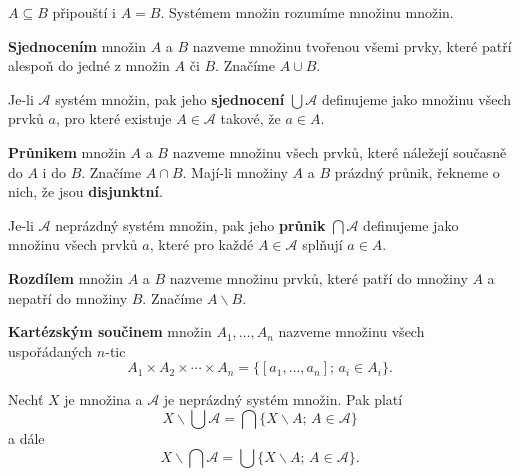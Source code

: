 \begin{poznamka}
	$A\subseteq B$ připouští i $A=B$. Systémem množin rozumíme množinu množin.
\end{poznamka}

\begin{definice}
\textbf{Sjednocením} množin $A$ a $B$ nazveme množinu tvořenou všemi prvky, které patří alespoň do jedné z množin $A$ či $B$. Značíme $A \cup B$.
\par Je-li $\mathcal{A}$ systém množin, pak jeho \textbf{sjednocení}
$\bigcup \mathcal{A}$
definujeme jako množinu všech prvků $a$, pro které existuje $A \in \mathcal{A}$ takové, že $a \in A$.
\end{definice}

\begin{definice}
\textbf{Průnikem} množin $A$ a $B$ nazveme množinu všech prvků, které náležejí současně do $A$ i do $B$. Značíme $A \cap B$. Mají-li množiny $A$ a $B$
prázdný průnik, řekneme o nich, že jsou \textbf{disjunktní}.
\par Je-li $\mathcal A$ neprázdný systém množin, pak jeho \textbf{průnik} $ \bigcap \mathcal A$ definujeme jako
množinu všech prvků $a$, které pro každé $A\in \mathcal A$ splňují $a\in A$.
\end{definice}

\begin{definice}
\textbf{Rozdílem} množin $A$ a $B$ nazveme množinu prvků, které patří do množiny $A$ a nepatří do množiny $B$. Značíme $A \smallsetminus B$.
\end{definice}

\begin{definice}
\textbf{Kartézským součinem} množin $A_1,\dots,A_n$ nazveme množinu všech uspořádaných $n$-tic
\[
A_1\times A_2 \times \cdots \times A_n
= \{[a_1,\dots,a_n];\, a_i \in A_i\}.
\]
\end{definice}

\begin{veta}\label{veta1.1}
Nechť $X$ je množina a $\mathcal{A}$ je neprázdný systém množin. Pak platí
\[
X \smallsetminus \bigcup \mathcal{A}
= \bigcap \{X \smallsetminus A;\, A \in \mathcal{A}\}
\]
a dále
\[
X \smallsetminus \bigcap \mathcal{A}
= \bigcup \{X \smallsetminus A;\, A \in \mathcal{A}\}.
\]
\end{veta}

